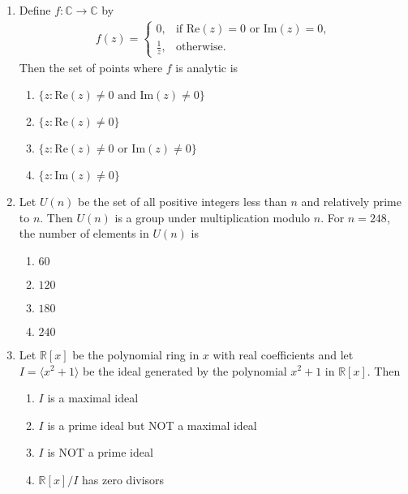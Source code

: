 \documentclass[journal]{IEEEtran}
\numberwithin{equation}{enumi}
\numberwithin{figure}{enumi}
\begin{document}
\begin{enumerate}
\item Define $f : \mathbb{C} \rightarrow \mathbb{C}$ by
\begin{align*}
f(z) =
\begin{cases}
0, & \text{if } \text{Re}(z) = 0 \text{ or } \text{Im}(z) = 0,\\
\frac{1}{z}, & \text{otherwise}.
\end{cases}
\end{align*}
Then the set of points where $f$ is analytic is    
\hfill{}

\begin{multicols}{2}
    \begin{enumerate}
        \item $\{z : \text{Re}(z) \neq 0 \text{ and } \text{Im}(z) \neq 0 \}$
        \item $\{z : \text{Re}(z) \neq 0 \}$
        \item $\{z : \text{Re}(z) \neq 0 \text{ or } \text{Im}(z) \neq 0 \}$
        \item $\{z : \text{Im}(z) \neq 0 \}$ 
    \end{enumerate}
    \end{multicols}


\item Let $U(n)$ be the set of all positive integers less than $n$ and relatively prime to $n$. Then $U(n)$ is a group under multiplication modulo $n$. For $n = 248$, the number of elements in $U(n)$ is
\hfill{}
\begin{multicols}{4}
\begin{enumerate}
    \item $60$
    \item $120$
    \item $180$
    \item $240$
\end{enumerate}
\end{multicols}



\item Let $\mathbb{R}[x]$ be the polynomial ring in $x$ with real coefficients and let $I = \langle x^2 + 1 \rangle$ be the ideal generated by the polynomial $x^2 + 1$ in $\mathbb{R}[x]$. Then        \hfill{}
\begin{enumerate}
   
\item $I$ is a maximal ideal
\item  $I$ is a prime ideal but NOT a maximal ideal
\item $I$ is NOT a prime ideal
\item  $\mathbb{R}[x]/I$ has zero divisors
\end{enumerate}




\end{enumerate}
\end{document}
